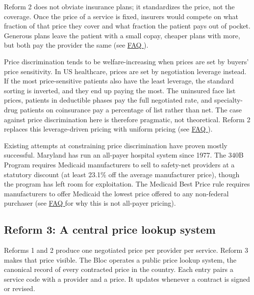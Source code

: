 \documentclass[12pt]{article}
\begin{document}
Reform 2 does not obviate insurance plans; it standardizes the price, not the coverage. Once the price of a service is fixed, insurers would compete on what fraction of that price they cover and what fraction the patient pays out of pocket. Generous plans leave the patient with a small copay, cheaper plans with more, but both pay the provider the same (see \href{https://rabbanimaysam.github.io/health_reform/faq.html}{FAQ \faqInsurance}).

Price discrimination tends to be welfare-increasing when prices are set by buyers' price sensitivity.\citep{varian1985pd} In US healthcare, prices are set by negotiation leverage instead. If the most price-sensitive patients also have the least leverage, the standard sorting is inverted, and they end up paying the most. The uninsured face list prices,\citep{dusetzina2016uninsured, bai2015markup} patients in deductible phases pay the full negotiated rate, and specialty-drug patients on coinsurance pay a percentage of list rather than net. The case against price discrimination here is therefore pragmatic, not theoretical.\citep{reinhardt2011allpayer, anderson2015allpayer} Reform 2 replaces this leverage-driven pricing with uniform pricing (see \href{https://rabbanimaysam.github.io/health_reform/faq.html}{FAQ \faqInvertedSchedule}).

Existing attempts at constraining price discrimination have proven mostly successful. Maryland has run an all-payer hospital system since 1977.\citep{murray2009maryland} The 340B Program requires Medicaid manufacturers to sell to safety-net providers at a statutory discount (at least 23.1\% off the average manufacturer price),\citep{medpac2015340b, ecfr447509} though the program has left room for exploitation.\citep{conti2014340b} The Medicaid Best Price rule requires manufacturers to offer Medicaid the lowest price offered to any non-federal purchaser (see \href{https://rabbanimaysam.github.io/health_reform/faq.html}{FAQ \faqAllPayer} for why this is not all-payer pricing).

\subsection*{Reform 3: A central price lookup system}

Reforms 1 and 2 produce one negotiated price per provider per service. Reform 3 makes that price visible. The Bloc operates a public price lookup system, the canonical record of every contracted price in the country. Each entry pairs a service code with a provider and a price. It updates whenever a contract is signed or revised.
\end{document}
